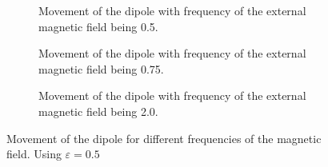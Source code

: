\begin{figure*}[htb]
    \begin{subfigure}[b]{\textwidth}
        
        \caption{Movement of the dipole with frequency of the external magnetic field being 0.5.}
        \label{fig:omega05}
    \end{subfigure}
    \begin{subfigure}[b]{\textwidth}
        
        \caption{Movement of the dipole with frequency of the external magnetic field being 0.75.}
        \label{fig:omega075}
    \end{subfigure}
    \begin{subfigure}[b]{\textwidth}
        
        \caption{Movement of the dipole with frequency of the external magnetic field being 2.0.}
        \label{fig:omega20}
    \end{subfigure}
    \caption{Movement of the dipole for different frequencies of the magnetic field. Using $\varepsilon = 0.5$}
\end{figure*}

